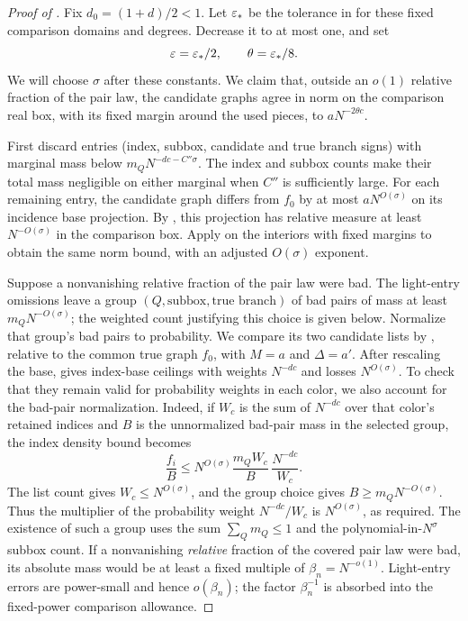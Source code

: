 \begin{proof}[Proof of ]
Fix \(d_0=(1+d)/2<1\).  Let \(\varepsilon_*\) be the tolerance in
 for these fixed comparison domains
and degrees.  Decrease it to at most one, and set
\begin{equation}
 \varepsilon=\varepsilon_*/2,\qquad \theta=\varepsilon_*/8.
 \label{a03:matching-tolerances}
\end{equation}
We will choose \(\sigma\) after these constants.  We claim that,
outside an \(o(1)\) relative fraction of the pair law, the candidate
graphs agree in norm on the comparison real box, with its fixed
margin around the used pieces, to \(aN^{-2\theta c}\).

First discard entries (index, subbox, candidate and true branch
signs) with marginal mass below \(m_QN^{-dc-C''\sigma}\).
The index and subbox counts make their total mass negligible on
either marginal when \(C''\) is sufficiently large.
For each remaining entry, the candidate graph differs from
\(f_0\) by at most \(aN^{O(\sigma)}\) on its incidence base
projection.  By , this projection
has relative measure at least \(N^{-O(\sigma)}\) in the comparison
box.  Apply  on the interiors with fixed
margins to obtain the same norm bound, with an adjusted
\(O(\sigma)\) exponent.

Suppose a nonvanishing relative fraction of the pair law were bad.
The light-entry omissions leave a group
\((Q,\text{subbox},\text{true branch})\) of bad pairs of mass
at least \(m_QN^{-O(\sigma)}\); the weighted count justifying
this choice is given below.  Normalize that group's bad pairs
to probability.  We compare its two candidate lists by
, relative to the common true graph
\(f_0\), with \(M=a\) and \(\Delta=a'\).
After rescaling the base,  gives
index-base ceilings with weights \(N^{-dc}\) and losses
\(N^{O(\sigma)}\).  To check that they remain valid for probability
weights in each color, we also account for the bad-pair normalization.
Indeed, if \(W_c\) is the sum of \(N^{-dc}\) over that color's retained
indices and \(B\) is the unnormalized bad-pair mass in the selected group,
the index density bound becomes
\begin{equation}
\frac{f_i}{B}
 \le N^{O(\sigma)}
       \frac{m_Q W_c}{B}\,
       \frac{N^{-dc}}{W_c}.
\end{equation}
The list count gives \(W_c\le N^{O(\sigma)}\), and the group choice gives
\(B\ge m_QN^{-O(\sigma)}\).  Thus the multiplier of the probability
weight \(N^{-dc}/W_c\) is \(N^{O(\sigma)}\), as required.
The existence of such a group uses the sum
\(\sum_Qm_Q\le1\) and the polynomial-in-\(N^\sigma\) subbox count.
If a nonvanishing \emph{relative} fraction of the covered pair law were
bad, its absolute mass would be at least a fixed multiple of
\(\beta_n=N^{-o(1)}\).  Light-entry errors are power-small and hence
\(o(\beta_n)\); the factor \(\beta_n^{-1}\) is absorbed into the
fixed-power comparison allowance.


\end{proof}

